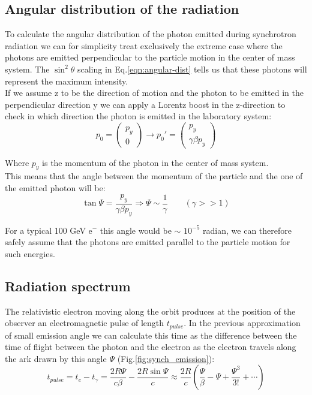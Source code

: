 \subsection{Angular distribution of the radiation}
 To calculate the angular distribution of the photon emitted during synchrotron radiation we can for simplicity treat exclusively the extreme case where the photons are emitted perpendicular to the particle motion in the center of mass system. The $\sin^2 \theta $ scaling in Eq.\ref{eqn:angular-dist} tells us that these photons will represent the maximum intensity.\\
 If we assume z to be the direction of motion and the photon to be emitted in the perpendicular direction y we can apply a Lorentz boost in the z-direction to check in which direction the photon is emitted in the laboratory system:
 \[
 p_0 = 
 \begin{pmatrix}
 p_y \\ 
 0
 \end{pmatrix}
\longrightarrow
p_0'=
\begin{pmatrix}
p_y \\
\gamma \beta p_y 
\end{pmatrix}  
 \]

Where $p_y$ is the momentum of the photon in the center of mass system. \\
This means that the angle between the momentum of the particle and the one of the emitted photon will be:
\begin{equation}
\tan \Psi = \frac{p_y}{\gamma \beta p_y} \Rightarrow \Psi \sim \frac{1}{\gamma} \qquad (\gamma >> 1)
\end{equation}

For a typical 100 GeV e$^-$ this angle would be $\sim$ $10^{-5}$ radian, we can therefore safely assume that the photons are emitted parallel to the particle motion for such energies.

\subsection{Radiation spectrum}
The relativistic electron moving  along the orbit produces  at the position of the observer an electromagnetic pulse of length $t_{pulse}$. In the previous approximation of small emission angle we can calculate this time as the difference between the time of flight between the photon and the electron as the electron travels along the ark drawn by this angle $\Psi$ (Fig.\ref{fig:synch_emission}):
\[t_{pulse} = t_e - t_{\gamma} =  \frac{2R\Psi}{c \beta} - \frac{2 R \sin \Psi}{c}
\approx \frac{2R}{c}\left(\frac{\Psi}{\beta}-\Psi+\frac{\Psi^3}{3!}+\cdots\right)
\]

